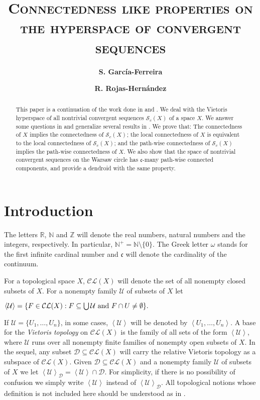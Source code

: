 \documentclass[11pt]{amsart}
\author{{\bfseries S. Garc\'ia-Ferreira}}
\title{\scshape\bfseries Connectedness like properties on the hyperspace of convergent sequences}
\author{{\bfseries R. Rojas-Hern\'andez}}
\date{}
\numberwithin{equation}{section}
\theoremstyle{plain}
\theoremstyle{definition}
\theoremstyle{definition}
\theoremstyle{definition}
\theoremstyle{definition}
\theoremstyle{definition}
\begin{document}
\begin{abstract}
This paper is a continuation of the work done in \cite{sal-yas} and \cite{may-pat-rob}. We deal with the Vietoris hyperspace of all nontrivial convergent sequences $\mathcal{S}_c(X)$ of a space $X$. We answer some questions in \cite{sal-yas} and generalize several results in \cite{may-pat-rob}. We prove that: The connectedness of $X$ implies the connectedness of $\mathcal{S}_c(X)$; the local connectedness of $X$ is equivalent to the local connectedness of $\mathcal{S}_c(X)$; and the path-wise connectedness of $\mathcal{S}_c(X)$ implies the path-wise connectedness of $X$. We also show that the space of nontrivial convergent sequences on the Warsaw circle has $\mathfrak{c}$-many path-wise connected components, and provide a dendroid with the same property.
\end{abstract}

\maketitle

\section{Introduction}

 The letters $\mathbb{R}$,  ${\mathbb N}$  and $\mathbb{Z}$ will denote the real numbers,   natural numbers and the integers, respectively. In particular, ${\mathbb N}^+ = {\mathbb N} \setminus\{0\}$. The Greek letter $\omega$ stands for the first infinite cardinal number and $\mathfrak{c}$ will denote the cardinality of the continuum.

\medskip

For a topological space $X$, $\mathcal{CL}(X)$ will denote the set of all nonempty closed subsets of $X$. For a nonempty family $\mathcal{U}$ of subsets of $X$ let
\begin{center}
$\left\langle \mathcal{U} \right\rangle = \{F \in \mathcal{CL}(X) : F \subseteq \bigcup{\mathcal{U}} \textnormal{ and } F \cap U \not= \emptyset\}.$
\end{center}
If $\mathcal{U} = \{U_1,\ldots,U_n\}$, in some cases,  $\left\langle \mathcal{U} \right\rangle$ will be denoted by  $\left\langle U_1,\ldots,U_n \right\rangle$. A base for the \textit{Vietoris topology} on $\mathcal{CL}(X)$ is the family of all sets of the form $\left\langle \mathcal{U}\right\rangle$, where $\mathcal{U}$ runs over all nonempty finite families of nonempty open subsets of $X$. In the sequel, any subset $\mathcal{D} \subseteq \mathcal{CL}(X)$ will carry the relative Vietoris topology as a subspace of $\mathcal{CL}(X)$. Given $\mathcal{D} \subseteq \mathcal{CL}(X)$ and a nonempty family $\mathcal{U}$ of subsets of $X$ we let $\left\langle \mathcal{U}\right\rangle_\mathcal{D} = \left\langle \mathcal{U}\right\rangle \cap \mathcal{D}$. For simplicity, if there is no possibility of confusion we simply write  $\left\langle \mathcal{U}\right\rangle$ instead of $\left\langle \mathcal{U}\right\rangle_\mathcal{D}$.
All topological notions whose definition is not included here should be understood as in \cite{eng}.
\end{document}
